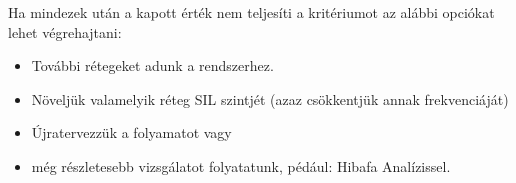 Ha mindezek után a kapott érték nem teljesíti a kritériumot az alábbi opciókat lehet végrehajtani:
\begin{itemize}
    \item További rétegeket adunk a rendszerhez.
    \item Növeljük valamelyik réteg SIL szintjét (azaz csökkentjük annak frekvenciáját)
    \item Újratervezzük a folyamatot vagy
    \item még részletesebb vizsgálatot folyatatunk, pédául: Hibafa Analízissel.
\end{itemize}